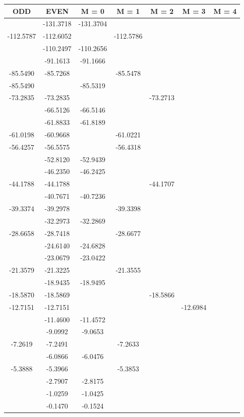 \documentclass[12pt]{article}
\begin{document}
\begin{table}[H]
\begin{center}
\begin{tabular}{ccccccc}
\toprule[1.5pt]
ODD & EVEN & M = 0 & M = 1 & M = 2 & M = 3 & M = 4\\ 
\midrule
& -131.3718 & -131.3704 & & & & \\ 
-112.5787 & -112.6052 & & -112.5786 & & & \\ 
& -110.2497 & -110.2656 & & & & \\ 
& -91.1613 & -91.1666 & & & & \\ 
-85.5490 & -85.7268 & & -85.5478 & & & \\ 
-85.5490 & & -85.5319 & & \\ 
-73.2835 & -73.2835 & & & -73.2713 & & \\ 
& -66.5126 & -66.5146 & & & & \\ 
& -61.8833 & -61.8189 & & & & \\ 
-61.0198 & -60.9668 & & -61.0221 & & & \\ 
-56.4257 & -56.5575 & & -56.4318 & & & \\ 
& -52.8120 & -52.9439 & & & & \\ 
& -46.2350 & -46.2425 & & & & \\ 
-44.1788 & -44.1788 & & & -44.1707 & & \\ 
& -40.7671 & -40.7236 & & & & \\ 
-39.3374 & -39.2978 & & -39.3398 & & & \\ 
& -32.2973 & -32.2869 & & & & \\ 
-28.6658 & -28.7418 & & -28.6677 & & & \\ 
& -24.6140 & -24.6828 & & & & \\ 
& -23.0679 & -23.0422 & & & & \\ 
-21.3579 & -21.3225 & & -21.3555 & & & \\ 
& -18.9435 & -18.9495 & & & & \\ 
-18.5870 & -18.5869 & & & -18.5866 & & \\ 
-12.7151 & -12.7151 & & & & -12.6984 & \\ 
& -11.4600 & -11.4572 & & & & \\ 
& -9.0992 & -9.0653 & & & & \\ 
-7.2619 & -7.2491 & & -7.2633 & & & \\ 
& -6.0866 & -6.0476 & & & & \\ 
-5.3888 & -5.3966 & & -5.3853 & & & \\ 
& -2.7907 & -2.8175 & & & & \\ 
& -1.0259 & -1.0425 & & & & \\ 
& -0.1470 & -0.1524 & & & & \\ 
\bottomrule
\end{tabular}
\end{center}
\end{table}
\end{document}
